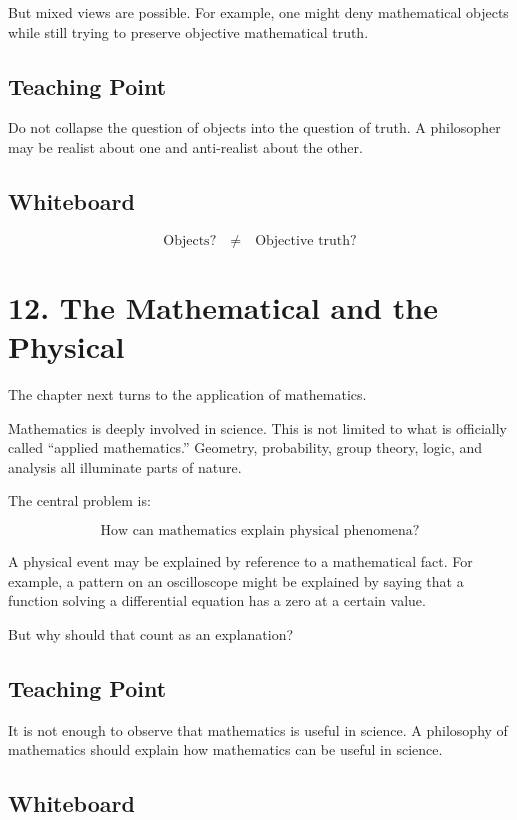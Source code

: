 \documentclass[11pt]{article}
\begin{document}
But mixed views are possible. For example, one might deny mathematical objects while
still trying to preserve objective mathematical truth.

\subsection*{Teaching Point}

Do not collapse the question of objects into the question of truth. A philosopher may be
realist about one and anti-realist about the other.

\subsection*{Whiteboard}

\[
\text{Objects?}
\quad \neq \quad
\text{Objective truth?}
\]

\section*{12. The Mathematical and the Physical}

The chapter next turns to the application of mathematics.

Mathematics is deeply involved in science. This is not limited to what is officially called
``applied mathematics.'' Geometry, probability, group theory, logic, and analysis all
illuminate parts of nature.

The central problem is:

\[
\boxed{
\text{How can mathematics explain physical phenomena?}
}
\]

A physical event may be explained by reference to a mathematical fact. For example, a
pattern on an oscilloscope might be explained by saying that a function solving a
differential equation has a zero at a certain value.

But why should that count as an explanation?

\subsection*{Teaching Point}

It is not enough to observe that mathematics is useful in science. A philosophy of
mathematics should explain how mathematics can be useful in science.

\subsection*{Whiteboard}
\end{document}
